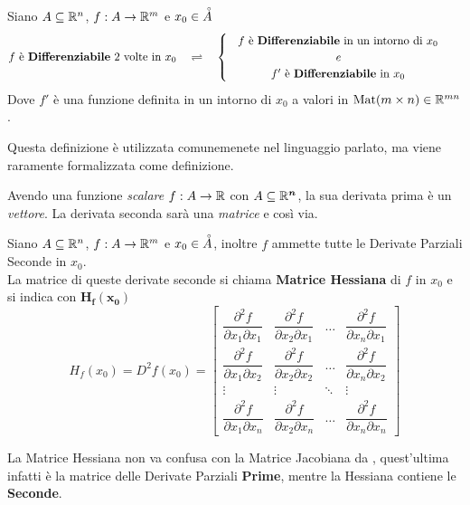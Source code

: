 \begin{definition}
	\label{def:differenz_second}
	Siano $A \subseteq \mathbb{R}^n$, $f:A \to \mathbb{R}^m$ e $x_0 \in \accentset{\circ}{A}$
	\[
		f \text{ è \textbf{Differenziabile} } 2 \text{ volte in } x_0
		\quad \bydef \quad
		\begin{cases}
			\text{
				\begin{tabular}{c}
					$f$ è \textbf{Differenziabile} in un intorno di $x_0$\\
					\textit{e}\\
					$f'$ è \textbf{Differenziabile} in $x_0$
				\end{tabular}
			}
		\end{cases}
	\]
	Dove $f'$ è una funzione definita in un intorno di $x_0$ a valori in $\operatorname{Mat}(m \times n) \in \mathbb{R}^{mn}$.
	\begin{note}
		Questa definizione è utilizzata comunemenete nel linguaggio parlato, ma viene raramente formalizzata come definizione.
	\end{note}
	\begin{note}
		Avendo una funzione	\textit{scalare} $f: A \to \mathbb{R}$ con $A \subseteq \boldsymbol{\mathbb{R}^n}$, la sua derivata prima è un \textit{vettore}. La derivata seconda sarà una \textit{matrice} e così via.
	\end{note}
\end{definition}

\begin{definition}
	\label{def:hessiana}
	Siano $A \subseteq \mathbb{R}^n$, $f:A \to \mathbb{R}^m$ e $x_0 \in \accentset{\circ}{A}$, inoltre $f$ ammette tutte le Derivate Parziali Seconde in $x_0$.\\
	La matrice di queste derivate seconde si chiama \textbf{Matrice Hessiana} di $f$ in $x_0$ e si indica con $\boldsymbol{H_f(x_0)}$
	\[
		H_f(x_0) = D^2f(x_0) =
		\begin{bmatrix}
			\dfrac{\partial^2 f}{\partial x_1 \partial x_1} & \dfrac{\partial^2 f}{\partial x_2 \partial x_1} & \dots & \dfrac{\partial^2 f}{\partial x_n \partial x_1}\\[3ex]
			\dfrac{\partial^2 f}{\partial x_1 \partial x_2} & \dfrac{\partial^2 f}{\partial x_2 \partial x_2} & \dots & \dfrac{\partial^2 f}{\partial x_n \partial x_2}\\[3ex]
			\vdots & \vdots & \ddots & \vdots\\[3ex]
			\dfrac{\partial^2 f}{\partial x_1 \partial x_n} & \dfrac{\partial^2 f}{\partial x_2 \partial x_n} & \dots & \dfrac{\partial^2 f}{\partial x_n \partial x_n}
		\end{bmatrix}
	\]
	\begin{note}
		La Matrice Hessiana non va confusa con la Matrice Jacobiana da , quest'ultima infatti è la matrice delle Derivate Parziali \textbf{Prime}, mentre la Hessiana contiene le \textbf{Seconde}.
	\end{note}
\end{definition}

